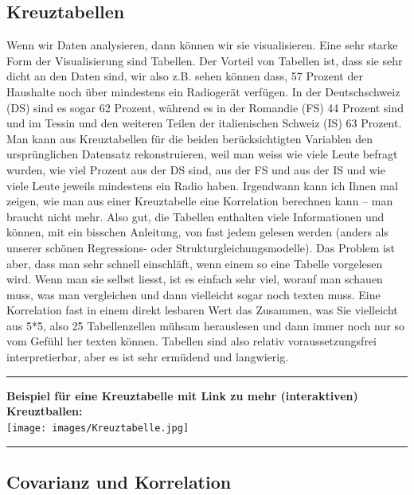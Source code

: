 \documentclass[
  10pt,
  letterpaper,
  a4paper, twoside]{scrreprt}
\begin{document}
\subsection{Kreuztabellen}\label{kreuztabellen}

Wenn wir Daten analysieren, dann können wir sie visualisieren. Eine sehr
starke Form der Visualisierung sind Tabellen. Der Vorteil von Tabellen
ist, dass sie sehr dicht an den Daten sind, wir also z.B. sehen können
dass, 57 Prozent der Haushalte noch über mindestens ein Radiogerät
verfügen. In der Deutschschweiz (DS) sind es sogar 62 Prozent, während
es in der Romandie (FS) 44 Prozent sind und im Tessin und den weiteren
Teilen der italienischen Schweiz (IS) 63 Prozent. Man kann aus
Kreuztabellen für die beiden berücksichtigten Variablen den
ursprünglichen Datensatz rekonstruieren, weil man weiss wie viele Leute
befragt wurden, wie viel Prozent aus der DS sind, aus der FS und aus der
IS und wie viele Leute jeweils mindestens ein Radio haben. Irgendwann
kann ich Ihnen mal zeigen, wie man aus einer Kreuztabelle eine
Korrelation berechnen kann -- man braucht nicht mehr. Also gut, die
Tabellen enthalten viele Informationen und können, mit ein bisschen
Anleitung, von fast jedem gelesen werden (anders als unserer schönen
Regressions- oder Strukturgleichungsmodelle). Das Problem ist aber, dass
man sehr schnell einschläft, wenn einem so eine Tabelle vorgelesen wird.
Wenn man sie selbst liesst, ist es einfach sehr viel, worauf man schauen
muss, was man vergleichen und dann vielleicht sogar noch texten muss.
Eine Korrelation fast in einem direkt lesbaren Wert das Zusammen, was
Sie vielleicht aus 5*5, also 25 Tabellenzellen mühsam herauslesen und
dann immer noch nur so vom Gefühl her texten können. Tabellen sind also
relativ voraussetzungsfrei interpretierbar, aber es ist sehr ermüdend
und langwierig.

\begin{center}\rule{0.5\linewidth}{0.5pt}\end{center}

\textbf{Beispiel für eine Kreuztabelle mit Link zu mehr (interaktiven)
Kreuztballen:}\\
\texttt{[image: images/Kreuztabelle.jpg]}

\begin{center}\rule{0.5\linewidth}{0.5pt}\end{center}

\subsection{Covarianz und Korrelation}\label{covarianz-und-korrelation}
\end{document}

